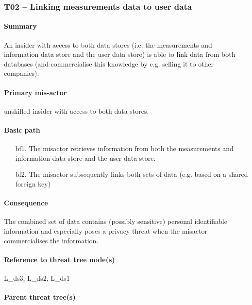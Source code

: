 \subsubsection{T02 -- Linking measurements data to user data}
\label{threats:t02}

\paragraph{Summary}

\npar An insider with access to both data stores (i.e. the measurements and
information data store and the user data store) is able to link data from both
databases (and commercialise this knowledge by e.g. selling it to other
companies).

\paragraph{Primary mis-actor}

\npar unskilled insider with access to both data stores.

\paragraph{Basic path}

\begin{enumerate}
	\item[bf1.] The misactor retrieves information from both the measurements and
	information data store and the user data store.
    \item[bf2.] The misactor subsequently links both sets of data (e.g. based
    on a shared foreign key)
\end{enumerate}

\paragraph{Consequence}

\npar The combined set of data contains (possibly sensitive) personal
identifiable information and especially poses a privacy threat when the misactor
commercialises the information.

\paragraph{Reference to threat tree node(s)}

L\_ds3, L\_ds2, L\_ds1

\paragraph{Parent threat tree(s)}


